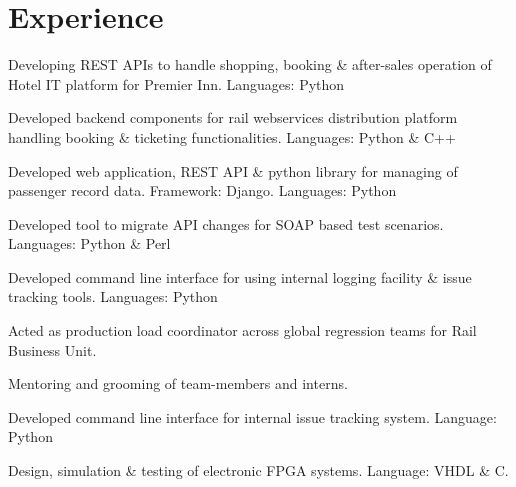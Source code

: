 \documentclass[]{Resume_Piyush}
\begin{document}
\begin{minipage}[t]{0.66\textwidth} 


\section{Experience}

\vspace{\topsep} %
\begin{tightemize}
\item Developing REST APIs to handle shopping, booking \& after-sales operation of Hotel IT platform for Premier Inn. Languages: Python
\item Developed backend components for rail webservices distribution platform handling booking \& ticketing functionalities. Languages: Python \& C++
\item Developed web application, REST API \& python library for managing of passenger record data. Framework: Django.  Languages: Python 
\item Developed tool to migrate API changes for SOAP based test scenarios. Languages: Python \& Perl 
\item Developed command line interface for using internal logging facility \& issue tracking tools. Languages: Python
\item Acted as production load coordinator across global regression teams for Rail Business Unit.
\item Mentoring and grooming of team-members and interns. 
\end{tightemize}
\sectionsep

\begin{tightemize}
\item Developed command line interface for internal issue tracking system. Language: Python
\end{tightemize}
\sectionsep

\begin{tightemize}
\item Design, simulation \& testing of electronic FPGA systems. Language: VHDL \& C.
\end{tightemize}
\sectionsep


\end{minipage}
\end{document}
